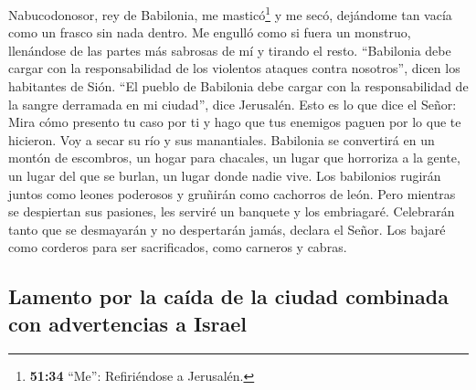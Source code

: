  Nabucodonosor, rey de Babilonia, me masticó\footnote{\textbf{51:34}
  ``Me'': Refiriéndose a Jerusalén.} y me secó, dejándome tan vacía como
un frasco sin nada dentro. Me engulló como si fuera un monstruo,
llenándose de las partes más sabrosas de mí y tirando el resto.
 ``Babilonia debe cargar con la responsabilidad de los
violentos ataques contra nosotros'', dicen los habitantes de Sión. ``El
pueblo de Babilonia debe cargar con la responsabilidad de la sangre
derramada en mi ciudad'', dice Jerusalén.  Esto es lo que
dice el Señor: Mira cómo presento tu caso por ti y hago que tus enemigos
paguen por lo que te hicieron. Voy a secar su río y sus manantiales.
 Babilonia se convertirá en un montón de escombros, un
hogar para chacales, un lugar que horroriza a la gente, un lugar del que
se burlan, un lugar donde nadie vive.  Los babilonios
rugirán juntos como leones poderosos y gruñirán como cachorros de león.
 Pero mientras se despiertan sus pasiones, les serviré un
banquete y los embriagaré. Celebrarán tanto que se desmayarán y no
despertarán jamás, declara el Señor.  Los bajaré como
corderos para ser sacrificados, como carneros y cabras.

\hypertarget{lamento-por-la-cauxedda-de-la-ciudad-combinada-con-advertencias-a-israel}{%
\subsection{Lamento por la caída de la ciudad combinada con advertencias
a
Israel}\label{lamento-por-la-cauxedda-de-la-ciudad-combinada-con-advertencias-a-israel}}

